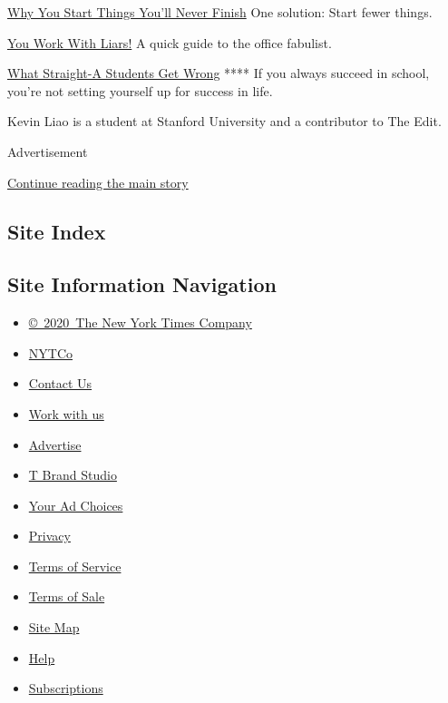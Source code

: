 \href{https://www.nytimes.com/2018/12/09/smarter-living/why-you-start-things-youll-never-finish.html}{Why
You Start Things You'll Never Finish} One solution: Start fewer things.

\href{https://www.nytimes.com/2018/12/07/business/work-advice-liars.html}{You
Work With Liars!} A quick guide to the office fabulist.

\href{https://www.nytimes.com/2018/12/08/opinion/college-gpa-career-success.html}{What
Straight-A Students Get Wrong} **** If you always succeed in school,
you're not setting yourself up for success in life.

Kevin Liao is a student at Stanford University and a contributor to The
Edit.

Advertisement

\protect\hyperlink{after-bottom}{Continue reading the main story}

\hypertarget{site-index}{%
\subsection{Site Index}\label{site-index}}

\hypertarget{site-information-navigation}{%
\subsection{Site Information
Navigation}\label{site-information-navigation}}

\begin{itemize}
\tightlist
\item
  \href{https://help.nytimes.com/hc/en-us/articles/115014792127-Copyright-notice}{©~2020~The
  New York Times Company}
\end{itemize}

\begin{itemize}
\tightlist
\item
  \href{https://www.nytco.com/}{NYTCo}
\item
  \href{https://help.nytimes.com/hc/en-us/articles/115015385887-Contact-Us}{Contact
  Us}
\item
  \href{https://www.nytco.com/careers/}{Work with us}
\item
  \href{https://nytmediakit.com/}{Advertise}
\item
  \href{http://www.tbrandstudio.com/}{T Brand Studio}
\item
  \href{https://www.nytimes.com/privacy/cookie-policy\#how-do-i-manage-trackers}{Your
  Ad Choices}
\item
  \href{https://www.nytimes.com/privacy}{Privacy}
\item
  \href{https://help.nytimes.com/hc/en-us/articles/115014893428-Terms-of-service}{Terms
  of Service}
\item
  \href{https://help.nytimes.com/hc/en-us/articles/115014893968-Terms-of-sale}{Terms
  of Sale}
\item
  \href{https://spiderbites.nytimes.com}{Site Map}
\item
  \href{https://help.nytimes.com/hc/en-us}{Help}
\item
  \href{https://www.nytimes.com/subscription?campaignId=37WXW}{Subscriptions}
\end{itemize}
